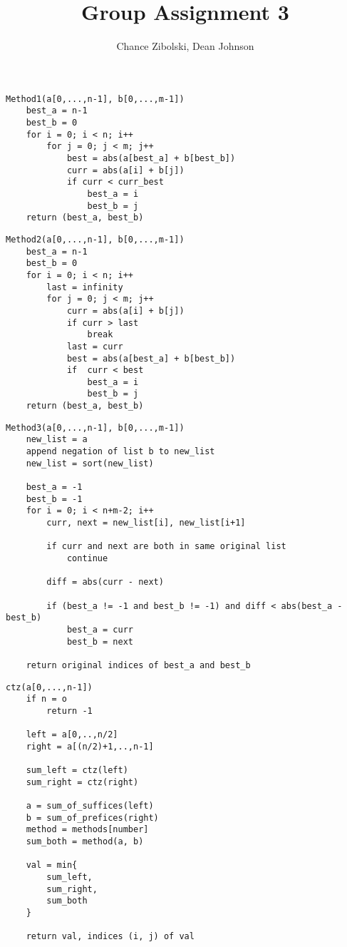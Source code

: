 \documentclass{article}
\title{Group Assignment 3}
\author{Chance Zibolski, Dean Johnson}
\begin{document}
\maketitle

\begin{verbatim}
Method1(a[0,...,n-1], b[0,...,m-1])
    best_a = n-1
    best_b = 0
    for i = 0; i < n; i++
        for j = 0; j < m; j++
            best = abs(a[best_a] + b[best_b])
            curr = abs(a[i] + b[j])
            if curr < curr_best
                best_a = i
                best_b = j
    return (best_a, best_b)
\end{verbatim}

\begin{verbatim}
Method2(a[0,...,n-1], b[0,...,m-1])
    best_a = n-1
    best_b = 0
    for i = 0; i < n; i++
        last = infinity
        for j = 0; j < m; j++
            curr = abs(a[i] + b[j])
            if curr > last
                break
            last = curr
            best = abs(a[best_a] + b[best_b])
            if  curr < best
                best_a = i
                best_b = j
    return (best_a, best_b)
\end{verbatim}

\begin{verbatim}
Method3(a[0,...,n-1], b[0,...,m-1])
    new_list = a
    append negation of list b to new_list
    new_list = sort(new_list)

    best_a = -1
    best_b = -1
    for i = 0; i < n+m-2; i++
        curr, next = new_list[i], new_list[i+1]

        if curr and next are both in same original list
            continue

        diff = abs(curr - next)

        if (best_a != -1 and best_b != -1) and diff < abs(best_a - best_b)
            best_a = curr
            best_b = next

    return original indices of best_a and best_b
\end{verbatim}


\begin{verbatim}
ctz(a[0,...,n-1])
    if n = o
        return -1

    left = a[0,..,n/2]
    right = a[(n/2)+1,..,n-1]

    sum_left = ctz(left)
    sum_right = ctz(right)

    a = sum_of_suffices(left)
    b = sum_of_prefices(right)
    method = methods[number]
    sum_both = method(a, b)

    val = min{
        sum_left,
        sum_right,
        sum_both
    }

    return val, indices (i, j) of val

\end{verbatim}
\end{document}
